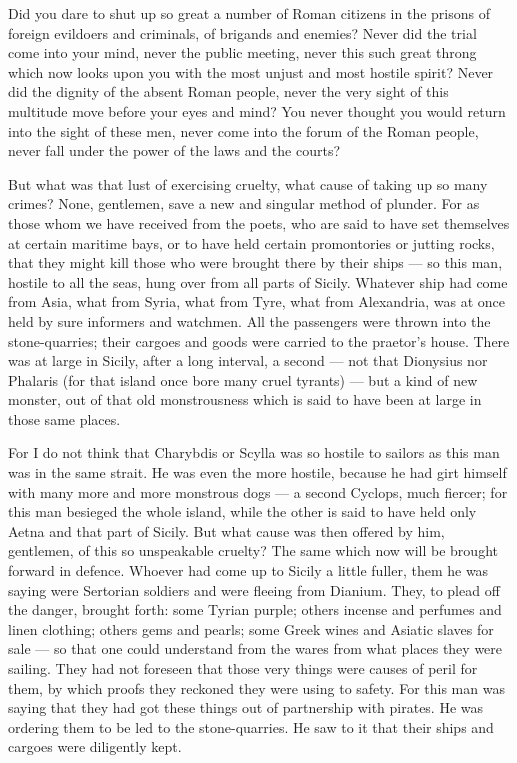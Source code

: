  Did you dare to shut up so great a number of Roman citizens in the prisons of foreign evildoers and criminals, of brigands and enemies? Never did the trial come into your mind, never the public meeting, never this such great throng which now looks upon you with the most unjust and most hostile spirit? Never did the dignity of the absent Roman people, never the very sight of this multitude move before your eyes and mind? You never thought you would return into the sight of these men, never come into the forum of the Roman people, never fall under the power of the laws and the courts?

 But what was that lust of exercising cruelty, what cause of taking up so many crimes? None, gentlemen, save a new and singular method of plunder. For as those whom we have received from the poets, who are said to have set themselves at certain maritime bays, or to have held certain promontories or jutting rocks, that they might kill those who were brought there by their ships --- so this man, hostile to all the seas, hung over from all parts of Sicily. Whatever ship had come from Asia, what from Syria, what from Tyre, what from Alexandria, was at once held by sure informers and watchmen. All the passengers were thrown into the stone-quarries; their cargoes and goods were carried to the praetor's house. There was at large in Sicily, after a long interval, a second --- not that Dionysius nor Phalaris (for that island once bore many cruel tyrants) --- but a kind of new monster, out of that old monstrousness which is said to have been at large in those same places.

 For I do not think that Charybdis or Scylla was so hostile to sailors as this man was in the same strait. He was even the more hostile, because he had girt himself with many more and more monstrous dogs --- a second Cyclops, much fiercer; for this man besieged the whole island, while the other is said to have held only Aetna and that part of Sicily. But what cause was then offered by him, gentlemen, of this so unspeakable cruelty? The same which now will be brought forward in defence. Whoever had come up to Sicily a little fuller, them he was saying were Sertorian soldiers and were fleeing from Dianium. They, to plead off the danger, brought forth: some Tyrian purple; others incense and perfumes and linen clothing; others gems and pearls; some Greek wines and Asiatic slaves for sale --- so that one could understand from the wares from what places they were sailing. They had not foreseen that those very things were causes of peril for them, by which proofs they reckoned they were using to safety. For this man was saying that they had got these things out of partnership with pirates. He was ordering them to be led to the stone-quarries. He saw to it that their ships and cargoes were diligently kept.

